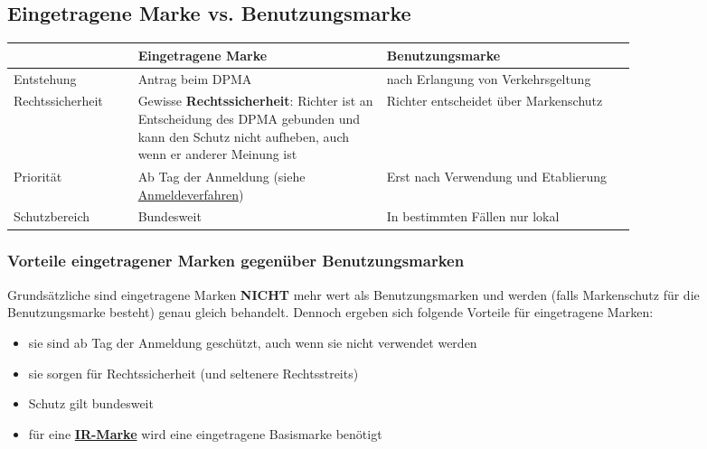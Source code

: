 \documentclass[12pt,A4]{extarticle}
\newcommand{\green}[1]{\textcolor{greenColor}{#1}}
\begin{document}
\subsection{Eingetragene Marke vs. Benutzungsmarke}
\bgroup
\def\arraystretch{1.5}
\begin{table}[h]
  \begin{tabular}{|l|p{0.4\linewidth}|p{0.4\linewidth}|}
    \hline \rowcolor{gray!30}
                     & Eingetragene Marke                                                                                                                                    & Benutzungsmarke                       \\ \hline
    Entstehung       & Antrag beim DPMA                                                                                                                                      & nach Erlangung von Verkehrsgeltung    \\ \hline
    Rechtssicherheit & Gewisse \textbf{Rechtssicherheit}: Richter ist an Entscheidung des DPMA gebunden und kann den Schutz nicht aufheben, auch wenn er anderer Meinung ist & Richter entscheidet über Markenschutz \\ \hline
    Priorität        & Ab Tag der Anmeldung (siehe \hyperref[sec:Anmeldeverfahren]{Anmeldeverfahren})                                                                        & Erst nach Verwendung und Etablierung  \\ \hline
    Schutzbereich    & Bundesweit                                                                                                                                            & In bestimmten Fällen nur lokal        \\ \hline
  \end{tabular}
\end{table}
\egroup

\subsubsection{Vorteile eingetragener Marken gegenüber Benutzungsmarken}
Grundsätzliche sind eingetragene Marken \textbf{NICHT} mehr wert als Benutzungsmarken und werden (falls Markenschutz für die Benutzungsmarke besteht) genau gleich behandelt.
Dennoch ergeben sich folgende Vorteile für eingetragene Marken:
\begin{itemize}
  \item{sie sind \green{ab Tag der Anmeldung geschützt}, auch wenn sie nicht verwendet werden}
  \item{sie sorgen für \green{Rechtssicherheit} (und seltenere Rechtsstreits)}
  \item{Schutz gilt \green{bundesweit}}
  \item{für eine \hyperref[sec:IRMarke]{\textbf{IR-Marke}} wird eine eingetragene Basismarke benötigt}
\end{itemize}
\end{document}
